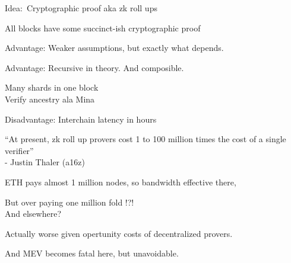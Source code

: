 \documentclass{beamer}
\begin{document}
\begin{frame}

Idea:\  Cryptographic proof aka zk roll ups \\ \bigskip

All blocks have some succinct-ish cryptographic proof

\bigskip\bigskip

Advantage:  Weaker assumptions, but exactly what depends. \\ \smallskip

\bigskip\bigskip

Advantage:  Recursive in theory.  And composible. \\ \medskip

\hspace{10pt} Many shards in one block \\ \smallskip
\hspace{10pt} Verify ancestry ala Mina  \\

\bigskip\bigskip

Disadvantage: Interchain latency in hours

\end{frame}



\begin{frame}

``At present, zk roll up provers cost 1 to 100 million times the cost of a single verifier'' \\ \smallskip
- Justin Thaler (a16z)

\bigskip\bigskip

ETH pays almost 1 million nodes, so bandwidth effective there, \\ \medskip 

\hspace{10pt} But over paying one million fold !?! \\ \smallskip
\hspace{10pt} And elsewhere?

\pause\bigskip\bigskip

Actually worse given opertunity costs of decentralized provers.  \\ \medskip 

\hspace{10pt} And MEV becomes fatal here, but unavoidable.

\end{frame}
\end{document}
